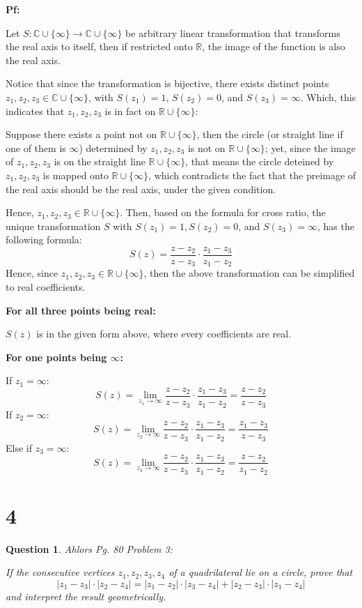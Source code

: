 \documentclass{article}
\newtheorem{question}{Question}
\begin{document}
\textbf{Pf:}

Let $S:\mathbb{C}\cup\{\infty\}\rightarrow \mathbb{C}\cup\{\infty\}$ be arbitrary linear transformation that transforms the real axis to itself, then if restricted onto $\mathbb{R}$, 
the image of the function is also the real axis. 

Notice that since the transformation is bijective,
there exists distinct points $z_1,z_2,z_3\in\mathbb{C}\cup\{\infty\}$, with $S(z_1)=1$, $S(z_2)=0$, and $S(z_3)=\infty$.
Which, this indicates that $z_1,z_2,z_3$ is in fact on $\mathbb{R}\cup\{\infty\}$:

Suppose there exists a point not on $\mathbb{R}\cup\{\infty\}$, then the circle (or straight line if one of them is $\infty$) determined by $z_1,z_2,z_3$ is not on $\mathbb{R}\cup\{\infty\}$;
yet, since the image of $z_1,z_2,z_3$ is on the straight line $\mathbb{R}\cup\{\infty\}$,
that means the circle deteined by $z_1,z_2,z_3$ is mapped onto $\mathbb{R}\cup\{\infty\}$, which contradicts the fact that the preimage
of the real axis should be the real axis, under the given condition.

\hfill

Hence, $z_1,z_2,z_3\in \mathbb{R}\cup\{\infty\}$. Then, based on the formula for cross ratio,
the unique transformation $S$ with $S(z_1)=1, S(z_2)=0$, and $S(z_3)=\infty$, has the following formula:
$$S(z)=\frac{z-z_2}{z-z_3}\cdot\frac{z_1-z_3}{z_1-z_2}$$
Hence, since $z_1,z_2,z_3\in \mathbb{R}\cup\{\infty\}$, then the above transformation can be simplified to real coefficients.

\hfill

\textbf{For all three points being real:}

$S(z)$ is in the given form above, where every coefficients are real.

\hfill

\textbf{For one points being $\infty$:}

If $z_1=\infty$:
$$S(z)=\lim_{z_1\rightarrow\infty}\frac{z-z_2}{z-z_3}\cdot\frac{z_1-z_3}{z_1-z_2}=\frac{z-z_2}{z-z_3}$$
If $z_2=\infty$:
$$S(z)=\lim_{z_2\rightarrow\infty}\frac{z-z_2}{z-z_3}\cdot\frac{z_1-z_3}{z_1-z_2}=\frac{z_1-z_3}{z-z_3}$$
Else if $z_3=\infty$:
$$S(z)=\lim_{z_3\rightarrow\infty}\frac{z-z_2}{z-z_3}\cdot\frac{z_1-z_3}{z_1-z_2}=\frac{z-z_2}{z_1-z_2}$$



\break

\section*{4}
\begin{myBox}[]{}
    \begin{question}
        Ahlors Pg. 80 Problem 3:

        If the consecutive vertices $z_1,z_2,z_3,z_4$ of a quadrilateral lie on a circle, prove that
        $$|z_1-z_3|\cdot|z_2-z_4|=|z_1-z_2|\cdot|z_3-z_4|+|z_2-z_3|\cdot|z_1-z_4|$$
        and interpret the result geometrically.
    \end{question}
\end{myBox}
\end{document}
